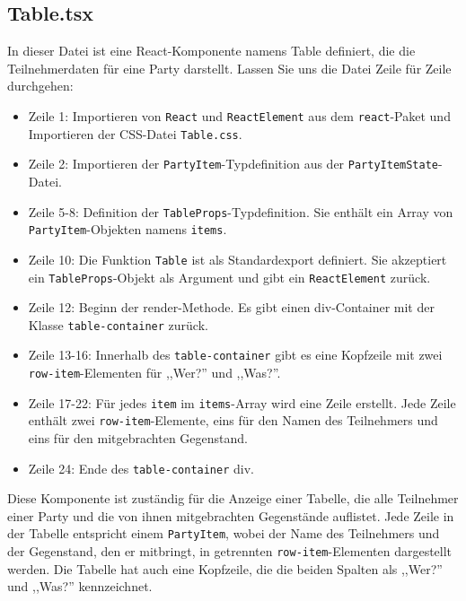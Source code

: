 \documentclass[./dokumentation.tex]{subfiles}
\begin{document}
\subsection{Table.tsx}

In dieser Datei ist eine React-Komponente namens Table definiert, die die Teilnehmerdaten für eine Party darstellt. Lassen Sie uns die Datei Zeile für Zeile durchgehen:\\
\begin{itemize}
    \item Zeile 1: Importieren von \verb+React+ und \verb+ReactElement+ aus dem \verb+react+-Paket und Importieren der CSS-Datei \verb+Table.css+. \\
    \item Zeile 2: Importieren der \verb+PartyItem+-Typdefinition aus der \verb+PartyItemState+-Datei.\\
    \item Zeile 5-8: Definition der \verb+TableProps+-Typdefinition. Sie enthält ein Array von \verb+PartyItem+-Objekten namens \verb+items+.\\
    \item Zeile 10: Die Funktion \verb+Table+ ist als Standardexport definiert. Sie akzeptiert ein \verb+TableProps+-Objekt als Argument und gibt ein \verb+ReactElement+ zurück.\\
    \item Zeile 12: Beginn der render-Methode. Es gibt einen div-Container mit der Klasse \verb+table-container+ zurück. \\
    \item Zeile 13-16: Innerhalb des \verb+table-container+ gibt es eine Kopfzeile mit zwei \verb+row-item+-Elementen für ,,Wer?'' und ,,Was?''. \\
    \item Zeile 17-22: Für jedes \verb+item+ im \verb+items+-Array wird eine Zeile erstellt. Jede Zeile enthält zwei \verb+row-item+-Elemente, eins für den Namen des Teilnehmers und eins für den mitgebrachten Gegenstand. \\
    \item Zeile 24: Ende des \verb+table-container+ div.\\
\end{itemize}

Diese Komponente ist zuständig für die Anzeige einer Tabelle, die alle Teilnehmer einer Party und die von ihnen mitgebrachten Gegenstände auflistet. Jede Zeile in der Tabelle entspricht einem \verb+PartyItem+, wobei der Name des Teilnehmers und der Gegenstand, den er mitbringt, in getrennten \verb+row-item+-Elementen dargestellt werden. Die Tabelle hat auch eine Kopfzeile, die die beiden Spalten als ,,Wer?'' und ,,Was?'' kennzeichnet.
\end{document}
